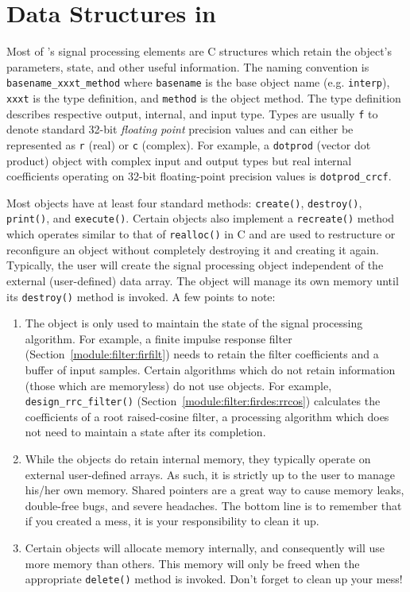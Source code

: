 \section{Data Structures in \liquid}
\label{section:data_structures}
Most of \liquid's signal processing elements are C structures which
retain the object's parameters, state, and other useful information.
The naming convention is
{\tt basename\_xxxt\_method} where
{\tt basename} is the base object name (e.g. {\tt interp}),
{\tt xxxt} is the type definition, and
{\tt method} is the object method.
The type definition describes respective output, internal, and input type.
Types are usually {\tt f} to denote standard 32-bit {\it floating point}
precision values and can either be represented as {\tt r} (real) or {\tt c}
(complex).
For example, a {\tt dotprod} (vector dot product) object with complex input
and output types but real internal coefficients operating on 32-bit
floating-point precision values is {\tt dotprod\_crcf}.

Most objects have at least four standard methods:
{\tt create()},
{\tt destroy()},
{\tt print()},
and
{\tt execute()}.
Certain objects also implement a {\tt recreate()} method which operates
similar to that of {\tt realloc()} in C and are used to restructure or
reconfigure an object without completely destroying it and creating it again.
Typically, the user will create the signal processing object independent of
the external (user-defined) data array.
The object will manage its own memory until its {\tt destroy()} method is
invoked.
A few points to note:
\begin{enumerate}
\item The object is only used to maintain the state of the signal processing
      algorithm.
      For example, a finite impulse response filter
      (Section~\ref{module:filter:firfilt}) needs to retain the filter
      coefficients and a buffer of input samples.
      Certain algorithms which do not retain information (those which are
      memoryless) do not use objects.
      For example, {\tt design\_rrc\_filter()}
      (Section~\ref{module:filter:firdes:rrcos})
      calculates the coefficients of a root raised-cosine filter, a processing
      algorithm which does not need to maintain a state after its completion.
\item While the objects do retain internal memory, they typically operate on
      external user-defined arrays.
      As such, it is strictly up to the user to manage his/her own memory.
      Shared pointers are a great way to cause memory leaks, double-free bugs,
      and severe headaches.
      The bottom line is to remember that if you created a mess, it is
      your responsibility to clean it up.
\item Certain objects will allocate memory internally, and consequently
      will use more memory than others.
      This memory will only be freed when the appropriate {\tt delete()}
      method is invoked.
      Don't forget to clean up your mess!
\end{enumerate}

